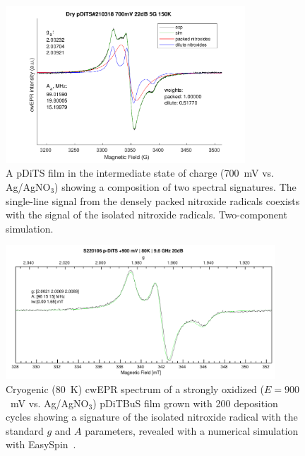 \begin{figure}[]
\center
	\includegraphics[width=0.8\textwidth]{./operando_epr/figures/CRYO/cw_sim_pDiTS_210318_700mV_2comp.pdf}
	\caption{A pDiTS film in the intermediate state of charge (700~mV vs. Ag/AgNO$_3$) showing a composition of two spectral signatures. The single-line signal from the densely packed nitroxide radicals coexists with the signal of the isolated nitroxide radicals. Two-component simulation.}
	\label{fig:cwEPR_CRYO_DiTS_2_COMP_SIM}
\end{figure}

\begin{figure}[h]
\center
	\includegraphics[width=0.9\textwidth]{./operando_epr/figures/CRYO/S220106_p-DiTS_OX_80K_CW_SIM.pdf}
	\caption{Cryogenic (80~K) cwEPR spectrum of a strongly oxidized ($E=900$~mV vs. Ag/AgNO$_3$) pDiTBuS film grown with 200 deposition cycles showing a signature of the isolated nitroxide radical with the standard $g$ and $A$ parameters, revealed with a numerical simulation with EasySpin~\cite{Stoll2006}.}
	\label{fig:cwEPR_CRYO_DiTBuS_CHG_SIM}
\end{figure}



